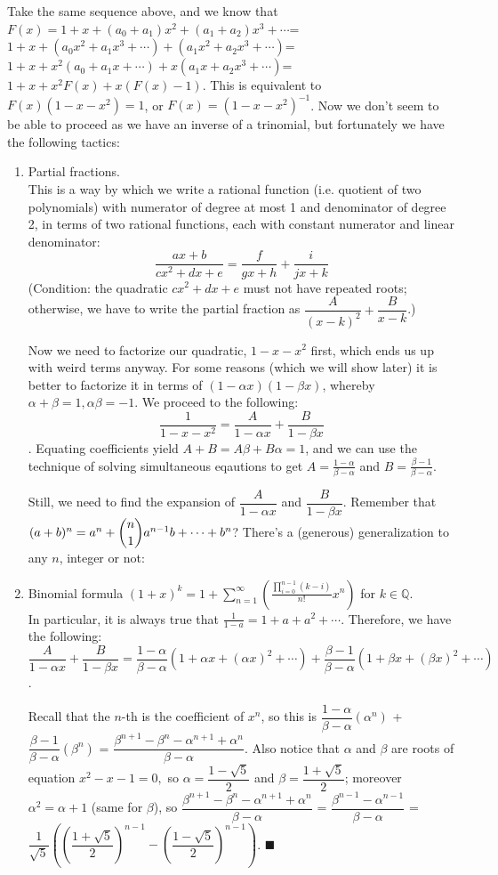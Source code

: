 \documentclass[11pt,a4paper]{article}
\begin{document}
Take the same sequence above, and we know that $F(x)=1+x+(a_0+a_1)x^2+(a_1+a_2)x^3+\cdots$=$1+x+(a_0x^2+a_1x^3+\cdots)+(a_1x^2+a_2x^3+\cdots)$=$1+x+x^2(a_0+a_1x+\cdots)+x(a_1x+a_2x^3+\cdots)$=$1+x+x^2F(x)+x(F(x)-1)$. This is equivalent to $F(x)(1-x-x^2)=1$, or $F(x)=(1-x-x^2)^{-1}$. Now we don't seem to be able to proceed as we have an inverse of a trinomial, but fortunately we have the following tactics:
\begin{enumerate}
\item Partial fractions.\\
This is a way by which we write a rational function (i.e. quotient of two polynomials) with numerator of degree at most 1 and denominator of degree 2, in terms of two rational functions, each with constant numerator and linear denominator:
$$\dfrac{ax+b}{cx^2+dx+e}=\dfrac{f}{gx+h}+\dfrac{i}{jx+k}$$
(Condition: the quadratic $cx^2+dx+e$ must not have repeated roots; otherwise, we have to write the partial fraction as $\dfrac{A}{(x-k)^2}+\dfrac{B}{x-k}$.)

Now we need to factorize our quadratic, $1-x-x^2$ first, which ends us up with weird terms anyway. For some reasons (which we will show later) it is better to factorize it in terms of $(1-\alpha x)(1-\beta x)$, whereby $\alpha+\beta=1, \alpha\beta=-1$. We proceed to the following: $$\dfrac{1}{1-x-x^2}=\dfrac{A}{1-\alpha x}+\dfrac{B}{1-\beta x}$$.
Equating coefficients yield $A+B=A\beta+B\alpha =1$, and we can use the technique of solving simultaneous eqautions to get $A=\frac{1-\alpha}{\beta-\alpha}$ and $B=\frac{\beta -1}{\beta-\alpha}$.

Still, we need to find the expansion of $\dfrac{A}{1-\alpha x}$ and $\dfrac{B}{1-\beta x}$. Remember that $(a+b)^{n}=a^n+\dbinom{n}{1}a^{n-1}b+\cdots +b^n$? There's a (generous) generalization to any $n$, integer or not:

\item Binomial formula
$(1+x)^k=1+\displaystyle\sum_{n=1}^{\infty} \left(\frac{\displaystyle\prod_{i=0}^{n-1} (k-i)}{n!}x^n\right)$ for $k\in\mathbb{Q}$.\\
In particular, it is always true that $\frac{1}{1-a}=1+a+a^2+\cdots$. Therefore, we have the following: $$\dfrac{A}{1-\alpha x}+\dfrac{B}{1-\beta x}=\frac{1-\alpha}{\beta-\alpha}(1+\alpha x+(\alpha x)^2+\cdots)+ \frac{\beta -1}{\beta-\alpha} (1+\beta x+(\beta x)^2+\cdots )$$.

Recall that the $n$-th is the coefficient of $x^n$, so this is $\dfrac{1-\alpha}{\beta-\alpha}(\alpha ^n)$ + $\dfrac{\beta -1}{\beta-\alpha} (\beta ^n)$ = $\dfrac{\beta ^{n+1}-\beta^{n}-\alpha^{n+1}+\alpha^{n}}{\beta-\alpha}$. Also notice that $\alpha$ and $\beta$ are roots of equation $x^2-x-1=0, $ so $\alpha=\dfrac{1-\sqrt{5}}{2}$ and $\beta=\dfrac{1+\sqrt{5}}{2}$; moreover $\alpha ^{2}=\alpha+1$ (same for $\beta$), so $\dfrac{\beta ^{n+1}-\beta^{n}-\alpha^{n+1}+\alpha^{n}}{\beta-\alpha}$ = $\dfrac{\beta ^{n-1}-\alpha^{n-1}}{\beta-\alpha}$ = $\dfrac{1}{\sqrt{5}}\left(\left(\dfrac{1+\sqrt{5}}{2}\right)^{n-1}-\left(\dfrac{1-\sqrt{5}}{2}\right)^{n-1}\right)$. $\blacksquare$


\end{enumerate}
\end{document}
